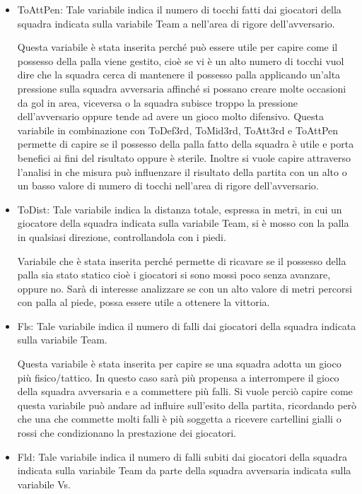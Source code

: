 \begin{itemize}
	\item \textsf{ToAttPen}: Tale variabile indica il numero di tocchi fatti dai giocatori della squadra indicata sulla variabile \textsf{Team} a nell'area di rigore dell'avversario. 
	
	Questa variabile è stata inserita perché può essere utile per capire come il possesso della palla viene gestito, cioè se vi è un alto numero di tocchi vuol dire che la squadra cerca di mantenere il possesso palla applicando un'alta pressione sulla squadra avversaria affinché si possano creare molte occasioni da gol in area, viceversa o la squadra subisce troppo la pressione dell'avversario oppure tende ad avere un gioco molto difensivo. Questa variabile in combinazione con \textsf{ToDef3rd}, \textsf{ToMid3rd}, \textsf{ToAtt3rd} e \textsf{ToAttPen} permette di capire se il possesso della palla fatto della squadra è utile e porta benefici ai fini del risultato oppure è sterile. Inoltre si vuole capire attraverso l'analisi in che misura può influenzare il risultato della partita con un alto o un basso valore di numero di tocchi nell'area di rigore dell'avversario.
	
	\item \textsf{ToDist}: Tale variabile indica la distanza totale, espressa in metri, in cui un giocatore della squadra indicata sulla variabile \textsf{Team}, si è mosso con la palla in qualsiasi direzione, controllandola con i piedi.
	
	Variabile che è stata inserita perché permette di ricavare se il possesso della palla sia stato statico cioè i giocatori si sono mossi poco senza avanzare, oppure no. Sarà di interesse analizzare se con un alto valore di metri percorsi con palla al piede, possa essere utile a ottenere la vittoria.
	\item \textsf{Fls}: Tale variabile indica il numero di falli dai giocatori della squadra indicata sulla variabile \textsf{Team}. 
	
	Questa variabile è stata inserita per capire se una squadra adotta un gioco più fisico/tattico. In questo caso sarà più propensa a interrompere il gioco della squadra avversaria e a commettere più falli. Si vuole perciò capire come questa variabile può andare ad influire sull'esito della partita, ricordando però che una che commette molti falli è più soggetta a ricevere cartellini gialli o rossi che condizionano la prestazione dei giocatori.
	\item \textsf{Fld}: Tale variabile indica il numero di falli subiti dai giocatori della squadra indicata sulla variabile \textsf{Team} da parte della squadra avversaria indicata sulla variabile \textsf{Vs}. 
	

\end{itemize}
